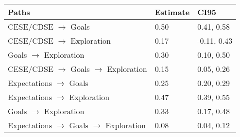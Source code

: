 \begin{table}[ht]
\centering
\begin{tabular}{lll}
  \hline
Paths & Estimate & CI95 \\ 
  \hline
\hspace{6mm}CESE/CDSE $\rightarrow$ Goals & 0.50 & 0.41, 0.58 \\ 
  \hspace{6mm}CESE/CDSE $\rightarrow$ Exploration & 0.17 & -0.11, 0.43 \\ 
  \hspace{6mm}Goals $\rightarrow$ Exploration & 0.30 & 0.10, 0.50 \\ 
  \hspace{6mm}CESE/CDSE $\rightarrow$ Goals $\rightarrow$ Exploration & 0.15 & 0.05, 0.26 \\ 
  \hspace{6mm}Expectations $\rightarrow$ Goals & 0.25 & 0.20, 0.29 \\ 
  \hspace{6mm}Expectations $\rightarrow$ Exploration & 0.47 & 0.39, 0.55 \\ 
  \hspace{6mm}Goals $\rightarrow$ Exploration & 0.33 & 0.17, 0.48 \\ 
  \hspace{6mm}Expectations $\rightarrow$ Goals $\rightarrow$ Exploration & 0.08 & 0.04, 0.12 \\ 
   \hline
\end{tabular}
\end{table}
